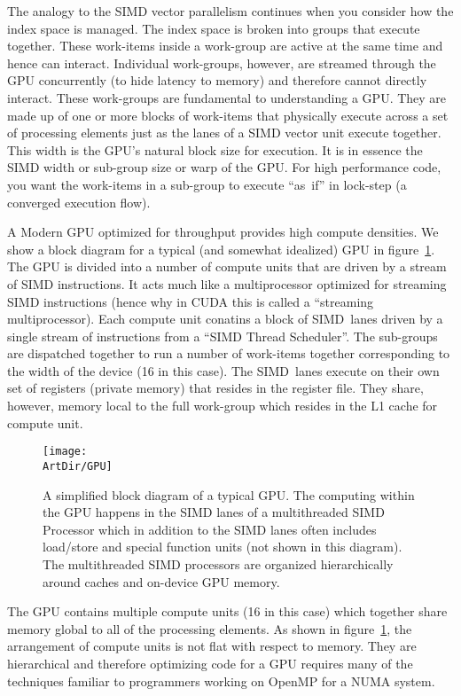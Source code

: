 The analogy to the SIMD vector parallelism continues when you consider how the index space is managed.  The 
index space is broken into groups that execute together.  These work-items inside a work-group are active
at the same time and hence can interact.  Individual work-groups, however, are streamed through the 
GPU concurrently (to hide latency to memory) and therefore cannot directly interact.   These work-groups
are fundamental to understanding a GPU.  They are made up of one or more blocks of work-items that 
physically execute across a set of processing elements just as the lanes of a SIMD vector unit execute
together.  This width is the GPU's natural block size for execution.  It is in essence the SIMD width or
sub-group size or warp of the GPU.  For high performance code, you want the work-items in a sub-group
to execute ``as~if'' in lock-step (a converged execution flow).

A Modern GPU optimized for throughput provides high compute densities.  We show a block diagram 
for a typical (and somewhat idealized) GPU in figure~\ref{figure:GPU}. The GPU is divided into a number
 of compute units that are driven by a stream of SIMD instructions.  It acts much like a multiprocessor 
 optimized for streaming SIMD instructions (hence why in CUDA this is called a ``streaming multiprocessor).
 Each compute unit conatins a block of SIMD~lanes
driven by a single stream of instructions from a ``SIMD Thread Scheduler''.  The sub-groups
are dispatched together to run a number of work-items together corresponding to the width
of the device (16 in this case).  The SIMD~lanes execute on their own set of registers (private memory)
that resides in the register file.  They share, however, memory local to the full work-group which resides 
in the L1 cache for compute unit.

\begin{figure}[!htbp]
\centerline{\texttt{[image: \\ArtDir/GPU]}}
\caption{A simplified block diagram of a typical GPU.  The computing within the GPU happens in the
SIMD lanes of a multithreaded SIMD Processor which in addition to the SIMD lanes often includes
load/store and special function units (not shown in this diagram).   The multithreaded SIMD processors
are organized hierarchically around caches and on-device GPU memory.}
\label{figure:GPU}
\end{figure}

The GPU contains multiple compute units (16 in this case) which together share memory global to 
all of the processing elements.  As shown in figure~\ref{figure:GPU}, the arrangement of compute units
is not flat with respect to memory.   They are hierarchical and therefore optimizing code for a GPU requires
many of the techniques familiar to programmers working on OpenMP for a NUMA system.

